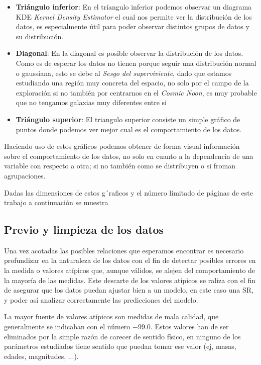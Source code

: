 \documentclass[11pt, a4paper]{article} %
\begin{document}
\begin{itemize}
    \item \textbf{Triángulo inferior}: En el tríangulo inferior podemos observar un diagrama KDE \textit{Kernel Density Estimator} el cual nos 
    permite ver la distribución de los datos, es especialmente útil para poder observar distintos grupos de datos y su distribución.
    \item \textbf{Diagonal}: En la diagonal es posible observar la distribución de los datos. Como es de esperar los datos no tienen porque seguir una distribución normal o gaussiana, esto se debe al \textit{Sesgo del superviviente}, dado que estamos estudiando
     una región muy concreta del espacio, no solo por el campo de la exploración si no también por centrarnos en el \textit{Cosmic Noon}, es muy probable que no tengamos galaxias muy diferentes entre si
    \item \textbf{Triángulo superior}: El triangulo superior consiste un simple gráfico de puntos donde podemos ver mejor cual es el comportamiento de los datos.
    
\end{itemize}

Haciendo uso de estos gráficos podemos obtener de forma visual información sobre el comportamiento de los datos, no solo en cuanto a la dependencia de una variable con respecto a otra; si no 
también como se distribuyen o si froman agrupaciones. 

Dadas las dimensiones de estos g´raficos y el número límitado de páginas de este trabajo a continuación se muestra

\subsection{Previo y limpieza de los datos}

Una vez acotadas las posibles relaciones que esperamos encontrar es necesario profundizar en la naturaleza de los datos con 
el fin de detectar posibles errores en la medida o valores atípicos que, aunque válidos, se alejen del comportamiento de la mayoría de las medidas. 
Este descarte de los valores atípicos se raliza con el fin de asegurar que los datos puedan ajustar bien a un modelo, en este caso una SR, y poder así analizar 
correctamente las predicciones del modelo. 

La mayor fuente de valores atípicos son medidas de mala calidad, que generalmente se indicaban con el número $-99.0$. Estos valores han de ser eliminados por la simple razón de carecer de sentido físico, en ninguno de los parámetros estudiados tiene sentido que puedan tomar ese valor (ej, masas, edades, magnitudes, ...). 
\end{document}
